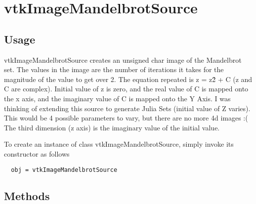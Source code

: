 \section{vtkImageMandelbrotSource}

\subsection{Usage}

 vtkImageMandelbrotSource creates an unsigned char image of the Mandelbrot
 set.  The values in the image are the number of iterations it takes for
 the magnitude of the value to get over 2.  The equation repeated is
 z = z\^2 + C (z and C are complex).  Initial value of z is zero, and the 
 real value of C is mapped onto the x axis, and the imaginary value of C
 is mapped onto the Y Axis.  I was thinking of extending this source
 to generate Julia Sets (initial value of Z varies).  This would be 4
 possible parameters to vary, but there are no more 4d images :(
 The third dimension (z axis) is the imaginary value of the initial value.

To create an instance of class vtkImageMandelbrotSource, simply
invoke its constructor as follows
\begin{verbatim}
  obj = vtkImageMandelbrotSource
\end{verbatim}
\subsection{Methods}


